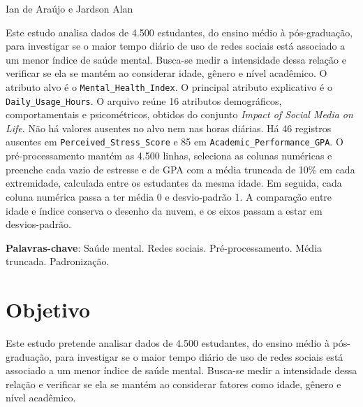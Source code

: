 \documentclass[
  article,
  12pt,
  oneside,
  a4paper,
  english,
  brazil,
  chapter=TITLE,
  section=TITLE,
  subsection=TITLE
]{abntex2}
\renewcommand{\imprimircapa}{%
  \begin{capa}%
    \SingleSpacing
    \begin{center}
      \imprimirinstituicao\par
      \vspace*{\fill}
      \imprimirautor\par
      \vspace*{\fill}
      {\bfseries\imprimirtitulo\par}
      \vspace*{\fill}
      \imprimirlocal\par
      \imprimirdata\par
    \end{center}
    \vspace*{1cm}
  \end{capa}%
}
\begin{document}
\pretextual
\imprimircapa
\imprimirfolhaderosto

\textual

\begin{center}
  \bfseries\imprimirtitulo
\end{center}

\vspace{0.75\baselineskip}
\noindent Ian de Araújo\footnotemark{} e Jardson Alan\footnotemark[\value{footnote}]

\begin{resumo}
Este estudo analisa dados de 4.500 estudantes, do ensino médio à pós-graduação, para investigar se o maior tempo diário de uso de redes sociais está associado a um menor índice de saúde mental. Busca-se medir a intensidade dessa relação e verificar se ela se mantém ao considerar idade, gênero e nível acadêmico. O atributo alvo é o \texttt{Mental\_Health\_Index}. O principal atributo explicativo é o \texttt{Daily\_Usage\_Hours}. O arquivo reúne 16 atributos demográficos, comportamentais e psicométricos, obtidos do conjunto \textit{Impact of Social Media on Life}. Não há valores ausentes no alvo nem nas horas diárias. Há 46 registros ausentes em \texttt{Perceived\_Stress\_Score} e 85 em \texttt{Academic\_Performance\_GPA}. O pré-processamento mantém as 4.500 linhas, seleciona as colunas numéricas e preenche cada vazio de estresse e de GPA com a média truncada de 10\% em cada extremidade, calculada entre os estudantes da mesma idade. Em seguida, cada coluna numérica passa a ter média 0 e desvio-padrão 1. A comparação entre idade e índice conserva o desenho da nuvem, e os eixos passam a estar em desvios-padrão.

\vspace{\onelineskip}
\noindent
\textbf{Palavras-chave}: Saúde mental. Redes sociais. Pré-processamento. Média truncada. \mbox{Padronização.}
\end{resumo}

\section{Objetivo}

Este estudo pretende analisar dados de 4.500 estudantes, do ensino médio à pós-graduação, para investigar se o maior tempo diário de uso de redes sociais está associado a um menor índice de saúde mental. Busca-se medir a intensidade dessa relação e verificar se ela se mantém ao considerar fatores como idade, gênero e nível acadêmico.
\end{document}
